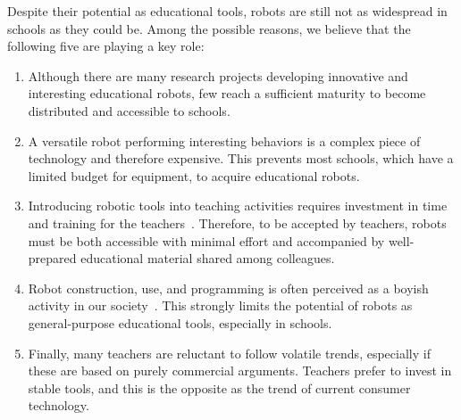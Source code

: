 \documentclass[letterpaper, 10 pt, conference]{ieeeconf}  %
\begin{document}
Despite their potential as educational tools, robots are still not as widespread in schools as they could be. Among the possible reasons, we believe that the following five are playing a key role:
\begin{enumerate}
\item Although there are many research projects developing innovative and interesting educational robots, few reach a sufficient maturity to become distributed and accessible to schools. 
\item A versatile robot performing interesting behaviors is a complex piece of technology and therefore expensive. 
This prevents most schools, which have a limited budget for equipment, to acquire educational robots.
\item Introducing robotic tools into teaching activities requires investment in time and training for the teachers~\cite{CERI2008}.
Therefore, to be accepted by teachers, robots must be both accessible with minimal effort and accompanied by well-prepared educational material shared among colleagues. 
\item Robot construction, use, and programming is often perceived as a boyish activity in our society~\cite{leonard2009lego,nourbakhsh2009robot}.
This strongly limits the potential of robots as general-purpose educational tools, especially in schools.
\item Finally, many teachers are reluctant to follow volatile trends, especially if these are based on purely commercial arguments.
Teachers prefer to invest in stable tools, and this is the opposite as the trend of current consumer technology. %
\end{enumerate}
\end{document}
